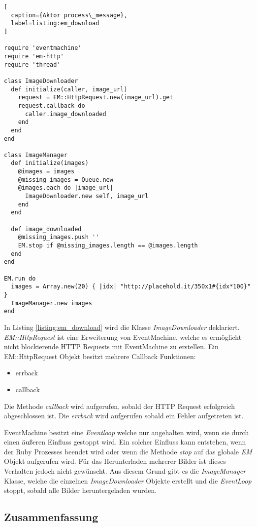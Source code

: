 \begin{lstlisting}[
  caption={Aktor process\_message},
  label=listing:em_download
]

require 'eventmachine'
require 'em-http'
require 'thread'

class ImageDownloader
  def initialize(caller, image_url)
    request = EM::HttpRequest.new(image_url).get
    request.callback do
      caller.image_downloaded
    end
  end
end

class ImageManager
  def initialize(images)
    @images = images
    @missing_images = Queue.new
    @images.each do |image_url|
      ImageDownloader.new self, image_url
    end
  end

  def image_downloaded
    @missing_images.push ''
    EM.stop if @missing_images.length == @images.length
  end
end

EM.run do
  images = Array.new(20) { |idx| "http://placehold.it/350x1#{idx*100}" }
  ImageManager.new images
end
\end{lstlisting}

In Listing \ref{listing:em_download} wird die Klasse \emph{ImageDownloader} deklariert. \emph{EM::HttpRequest} ist eine Erweiterung von EventMachine, welche es ermöglicht nicht blockierende HTTP Requests mit EventMachine zu erstellen. Ein EM::HttpRequest Objekt besitzt mehrere Callback Funktionen:

\begin{itemize}
  \item errback
  \item callback
\end{itemize}

Die Methode \emph{callback} wird aufgerufen, sobald der HTTP Request erfolgreich abgeschlossen ist. Die \emph{errback} wird aufgerufen sobald ein Fehler aufgetreten ist.

EventMachine besitzt eine \emph{Eventloop} welche nur angehalten wird, wenn sie durch einen äußeren Einfluss gestoppt wird. Ein solcher Einfluss kann entstehen, wenn der Ruby Prozesses beendet wird oder wenn die Methode \emph{stop} auf das globale \emph{EM} Objekt aufgerufen wird. Für das Herunterladen mehrerer Bilder ist dieses Verhalten jedoch nicht gewünscht. Aus diesem Grund gibt es die \emph{ImageManager} Klasse, welche die einzelnen \emph{ImageDownloader} Objekte erstellt und die \emph{EventLoop} stoppt, sobald alle Bilder heruntergeladen wurden. 

\subsection{Zusammenfassung}

